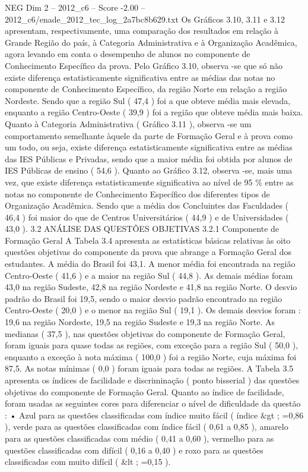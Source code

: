 \begin{textsample}{NEG Dim 2 – 2012\_c6 – Score -2.00 – 2012\_c6/enade\_2012\_tec\_log\_2a7bc8b629.txt}
Os Gráficos 3.10, 3.11 e 3.12 apresentam, respectivamente, uma comparação dos resultados em relação à Grande Região do país, à Categoria Administrativa e à Organização Acadêmica, agora levando em conta o desempenho de alunos no componente de Conhecimento Específico da prova.
Pelo Gráfico 3.10, observa -se que só não existe diferença estatisticamente significativa entre as médias das notas no componente de Conhecimento Específico, da região Norte em relação a região Nordeste.
Sendo que a região Sul ( 47,4 ) foi a que obteve média mais elevada, enquanto a região Centro-Oeste ( 39,9 ) foi a região que obteve média mais baixa.
Quanto à Categoria Administrativa ( Gráfico 3.11 ), observa -se um comportamento semelhante àquele da parte de Formação Geral e à prova como um todo, ou seja, existe diferença estatisticamente significativa entre as médias das IES Públicas e Privadas, sendo que a maior média foi obtida por alunos de IES Públicas de ensino ( 54,6 ).
Quanto ao Gráfico 3.12, observa -se, mais uma vez, que existe diferença estatisticamente significativa ao nível de 95 \% entre as notas no componente de Conhecimento Específico dos diferentes tipos de Organização Acadêmica.
Sendo que a média dos Concluintes das Faculdades ( 46,4 ) foi maior do que de Centros Universitários ( 44,9 ) e de Universidades ( 43,0 ). 3.2 ANÁLISE DAS QUESTÕES OBJETIVAS 3.2.1 Componente de Formação Geral A Tabela 3.4 apresenta as estatísticas básicas relativas às oito questões objetivas do componente da prova que abrange a Formação Geral dos estudantes.
A média do Brasil foi 43,1.
A menor média foi encontrada na região Centro-Oeste ( 41,6 ) e a maior na região Sul ( 44,8 ).
As demais médias foram 43,0 na região Sudeste, 42,8 na região Nordeste e 41,8 na região Norte.
O desvio padrão do Brasil foi 19,5, sendo o maior desvio padrão encontrado na região Centro-Oeste ( 20,0 ) e o menor na região Sul ( 19,1 ).
Os demais desvios foram : 19,6 na região Nordeste, 19,5 na região Sudeste e 19,3 na região Norte.
As medianas ( 37,5 ), nas questões objetivas do componente de Formação Geral, foram iguais para quase todas as regiões, com exceção para a região Sul ( 50,0 ), enquanto a exceção à nota máxima ( 100,0 ) foi a região Norte, cuja máxima foi 87,5.
As notas mínimas ( 0,0 ) foram iguais para todas as regiões.
A Tabela 3.5 apresenta os índices de facilidade e discriminação ( ponto bisserial ) das questões objetivas do componente de Formação Geral.
Quanto ao índice de facilidade, foram usadas as seguintes cores para diferenciar o nível de dificuldade da questão : • Azul para as questões classificadas com índice muito fácil ( índice \&gt ; =0,86 ), verde para as questões classificadas com índice fácil ( 0,61 a 0,85 ), amarelo para as questões classificadas com médio ( 0,41 a 0,60 ), vermelho para as questões classificadas com difícil ( 0,16 a 0,40 ) e roxo para as questões classificadas com muito difícil ( \&lt ; =0,15 ).

\end{textsample}
